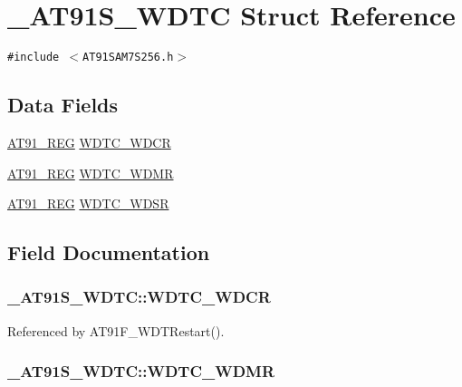 \hypertarget{struct__AT91S__WDTC}{
\section{\_\-AT91S\_\-WDTC Struct Reference}
\label{struct__AT91S__WDTC}
}
{\tt \#include $<$AT91SAM7S256.h$>$}

\subsection*{Data Fields}
\begin{CompactItemize}
\item 
\hyperlink{AT91SAM7X256_8h_712ad5a1ac1bd02f3e95a7526c283ce1}{AT91\_\-REG} \hyperlink{struct__AT91S__WDTC_83fe4eae922b8dd5b96b3e2609d0027b}{WDTC\_\-WDCR}
\item 
\hyperlink{AT91SAM7X256_8h_712ad5a1ac1bd02f3e95a7526c283ce1}{AT91\_\-REG} \hyperlink{struct__AT91S__WDTC_fb49315d8e3b7aa048339a1f9d78145e}{WDTC\_\-WDMR}
\item 
\hyperlink{AT91SAM7X256_8h_712ad5a1ac1bd02f3e95a7526c283ce1}{AT91\_\-REG} \hyperlink{struct__AT91S__WDTC_2ecb6e3d2e39dbb08f6e797d337522c4}{WDTC\_\-WDSR}
\end{CompactItemize}


\subsection{Field Documentation}
\hypertarget{struct__AT91S__WDTC_83fe4eae922b8dd5b96b3e2609d0027b}{
\subsubsection{ {\bf \_\-AT91S\_\-WDTC::WDTC\_\-WDCR}}}
\label{struct__AT91S__WDTC_83fe4eae922b8dd5b96b3e2609d0027b}




Referenced by AT91F\_\-WDTRestart().\hypertarget{struct__AT91S__WDTC_fb49315d8e3b7aa048339a1f9d78145e}{
\subsubsection{ {\bf \_\-AT91S\_\-WDTC::WDTC\_\-WDMR}}}
\label{struct__AT91S__WDTC_fb49315d8e3b7aa048339a1f9d78145e}




